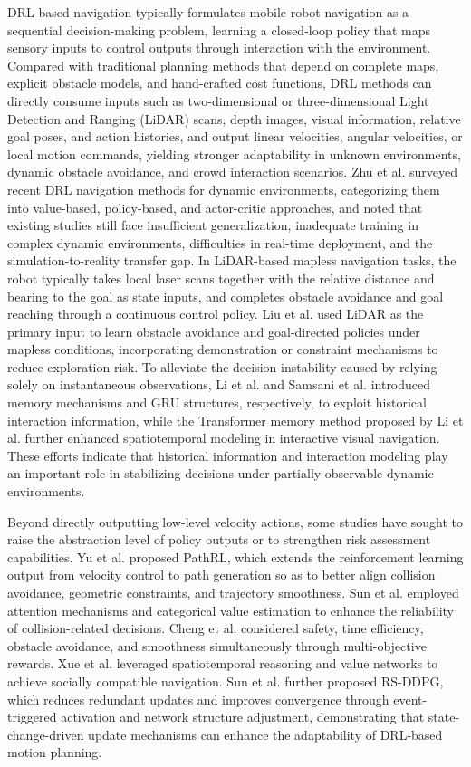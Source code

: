 DRL-based navigation typically formulates mobile robot navigation as a sequential decision-making problem, learning a closed-loop policy that maps sensory inputs to control outputs through interaction with the environment. Compared with traditional planning methods that depend on complete maps, explicit obstacle models, and hand-crafted cost functions, DRL methods can directly consume inputs such as two-dimensional or three-dimensional Light Detection and Ranging (LiDAR) scans, depth images, visual information, relative goal poses, and action histories, and output linear velocities, angular velocities, or local motion commands, yielding stronger adaptability in unknown environments, dynamic obstacle avoidance, and crowd interaction scenarios. Zhu et al. \cite{28} surveyed recent DRL navigation methods for dynamic environments, categorizing them into value-based, policy-based, and actor-critic approaches, and noted that existing studies still face insufficient generalization, inadequate training in complex dynamic environments, difficulties in real-time deployment, and the simulation-to-reality transfer gap. In LiDAR-based mapless navigation tasks, the robot typically takes local laser scans together with the relative distance and bearing to the goal as state inputs, and completes obstacle avoidance and goal reaching through a continuous control policy. Liu et al. \cite{6} used LiDAR as the primary input to learn obstacle avoidance and goal-directed policies under mapless conditions, incorporating demonstration or constraint mechanisms to reduce exploration risk. To alleviate the decision instability caused by relying solely on instantaneous observations, Li et al. \cite{8} and Samsani et al. \cite{7} introduced memory mechanisms and GRU structures, respectively, to exploit historical interaction information, while the Transformer memory method proposed by Li et al. \cite{8} further enhanced spatiotemporal modeling in interactive visual navigation. These efforts indicate that historical information and interaction modeling play an important role in stabilizing decisions under partially observable dynamic environments.

Beyond directly outputting low-level velocity actions, some studies have sought to raise the abstraction level of policy outputs or to strengthen risk assessment capabilities. Yu et al. \cite{27} proposed PathRL, which extends the reinforcement learning output from velocity control to path generation so as to better align collision avoidance, geometric constraints, and trajectory smoothness. Sun et al. \cite{9} employed attention mechanisms and categorical value estimation to enhance the reliability of collision-related decisions. Cheng et al. \cite{10} considered safety, time efficiency, obstacle avoidance, and smoothness simultaneously through multi-objective rewards. Xue et al. \cite{11} leveraged spatiotemporal reasoning and value networks to achieve socially compatible navigation. Sun et al. \cite{15} further proposed RS-DDPG, which reduces redundant updates and improves convergence through event-triggered activation and network structure adjustment, demonstrating that state-change-driven update mechanisms can enhance the adaptability of DRL-based motion planning.

